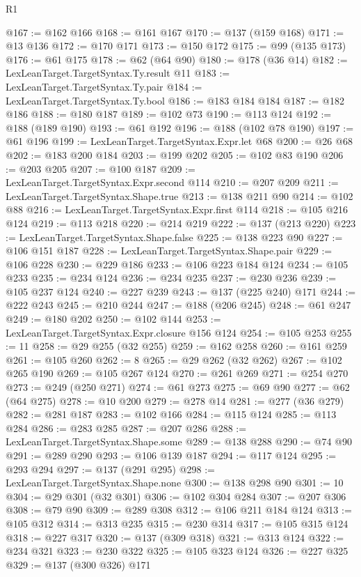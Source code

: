 \begin{lexlean}{R1}
\begin{coremodule}
@167 := @162 @166
@168 := @161 @167
@170 := @137 (@159 @168)
@171 := @13 @136
@172 := @170 @171
@173 := @150 @172
@175 := @99 (@135 @173)
@176 := @61 @175
@178 := @62 (@64 @90)
@180 := @178 (@36 @14)
@182 := LexLeanTarget.TargetSyntax.Ty.result @11
@183 := LexLeanTarget.TargetSyntax.Ty.pair
@184 := LexLeanTarget.TargetSyntax.Ty.bool
@186 := @183 @184 @184
@187 := @182 @186
@188 := @180 @187
@189 := @102 @73
@190 := @113 @124
@192 := @188 (@189 @190)
@193 := @61 @192
@196 := @188 (@102 @78 @190)
@197 := @61 @196
@199 := LexLeanTarget.TargetSyntax.Expr.let @68
@200 := @26 @68
@202 := @183 @200 @184
@203 := @199 @202
@205 := @102 @83 @190
@206 := @203 @205
@207 := @100 @187
@209 := LexLeanTarget.TargetSyntax.Expr.second @114
@210 := @207 @209
@211 := LexLeanTarget.TargetSyntax.Shape.true
@213 := @138 @211 @90
@214 := @102 @88
@216 := LexLeanTarget.TargetSyntax.Expr.first @114
@218 := @105 @216 @124
@219 := @113 @218
@220 := @214 @219
@222 := @137 (@213 @220)
@223 := LexLeanTarget.TargetSyntax.Shape.false
@225 := @138 @223 @90
@227 := @106 @151 @187
@228 := LexLeanTarget.TargetSyntax.Shape.pair
@229 := @106 @228
@230 := @229 @186
@233 := @106 @223 @184 @124
@234 := @105 @233
@235 := @234 @124
@236 := @234 @235
@237 := @230 @236
@239 := @105 @237 @124
@240 := @227 @239
@243 := @137 (@225 @240) @171
@244 := @222 @243
@245 := @210 @244
@247 := @188 (@206 @245)
@248 := @61 @247
@249 := @180 @202
@250 := @102 @144
@253 := LexLeanTarget.TargetSyntax.Expr.closure @156 @124
@254 := @105 @253
@255 := 11
@258 := @29 @255 (@32 @255)
@259 := @162 @258
@260 := @161 @259
@261 := @105 @260
@262 := 8
@265 := @29 @262 (@32 @262)
@267 := @102 @265 @190
@269 := @105 @267 @124
@270 := @261 @269
@271 := @254 @270
@273 := @249 (@250 @271)
@274 := @61 @273
@275 := @69 @90
@277 := @62 (@64 @275)
@278 := @10 @200
@279 := @278 @14
@281 := @277 (@36 @279)
@282 := @281 @187
@283 := @102 @166
@284 := @115 @124
@285 := @113 @284
@286 := @283 @285
@287 := @207 @286
@288 := LexLeanTarget.TargetSyntax.Shape.some
@289 := @138 @288
@290 := @74 @90
@291 := @289 @290
@293 := @106 @139 @187
@294 := @117 @124
@295 := @293 @294
@297 := @137 (@291 @295)
@298 := LexLeanTarget.TargetSyntax.Shape.none
@300 := @138 @298 @90
@301 := 10
@304 := @29 @301 (@32 @301)
@306 := @102 @304 @284
@307 := @207 @306
@308 := @79 @90
@309 := @289 @308
@312 := @106 @211 @184 @124
@313 := @105 @312
@314 := @313 @235
@315 := @230 @314
@317 := @105 @315 @124
@318 := @227 @317
@320 := @137 (@309 @318)
@321 := @313 @124
@322 := @234 @321
@323 := @230 @322
@325 := @105 @323 @124
@326 := @227 @325
@329 := @137 (@300 @326) @171

\end{coremodule}
\end{lexlean}
